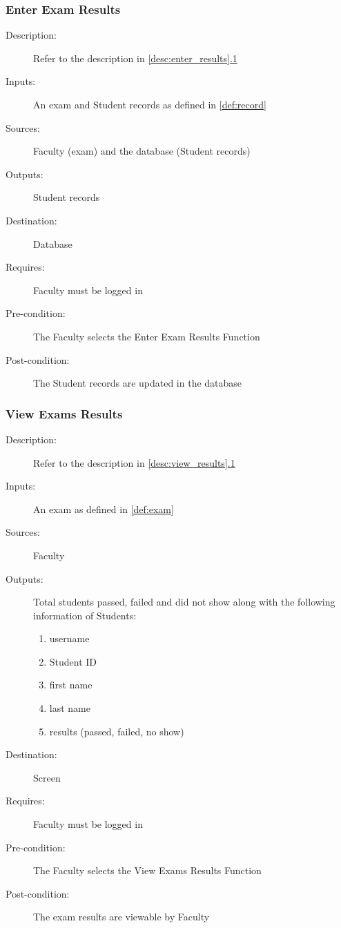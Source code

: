 \subsubsection{\large Enter Exam Results} 
\begin{boxed} %
\begin{description}
\item[Description:]
   Refer to the description in \autoref{desc:enter_results}\hyperref[desc:enter_results]{.1}
\item[Inputs:]
   An exam and Student records as defined in \autoref{def:record}
\item[Sources:]
   Faculty (exam) and the database (Student records)
\item[Outputs:]
   Student records
\item[Destination:]
   Database
\item[Requires:]
   Faculty must be logged in
\item[Pre-condition:]
   The Faculty selects the Enter Exam Results Function
\item[Post-condition:]
   The Student records are updated in the database
\end{description}
\end{boxed} %

\subsubsection{\large View Exams Results} 
\begin{boxed} %
\begin{description}
\item[Description:]
   Refer to the description in \autoref{desc:view_results}\hyperref[desc:view_results]{.1}
\item[Inputs:]
   An exam as defined in \autoref{def:exam}
\item[Sources:]
   Faculty
\item[Outputs:]
   Total students passed, failed and did not show along with the following
   information of Students:
   \begin{enumerate}
      \item username
      \item Student ID
      \item first name
      \item last name
      \item results (passed, failed, no show)
   \end{enumerate}
\item[Destination:]
   Screen
\item[Requires:]
   Faculty must be logged in
\item[Pre-condition:]
   The Faculty selects the View Exams Results Function
\item[Post-condition:]
   The exam results are viewable by Faculty
\end{description}
\end{boxed} %

